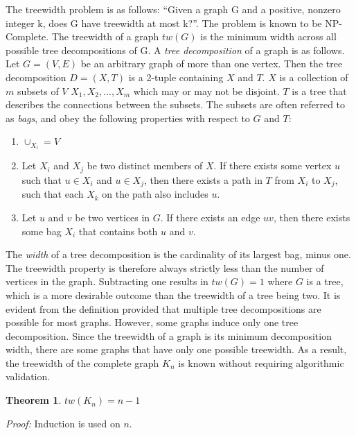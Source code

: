 \documentclass[12pt,conference]{IEEEtran}
\theoremstyle{plain}
\newtheorem{theorem}{Theorem}
\begin{document}
The treewidth problem is as follows: ``Given a graph G and a positive, nonzero integer k, does G have treewidth at most k?''. The problem is known to be NP-Complete. The treewidth of a graph $tw(G)$ is the minimum width across all possible tree decompositions of G. A \textit{tree decomposition} of a graph is as follows. Let $G=(V,E)$ be an arbitrary graph of more than one vertex. Then the tree decomposition $D = (X,T)$ is a 2-tuple containing $X$ and $T$. $X$ is a collection of $m$ subsets of $V$ $X_{1}, X_{2}, ..., X_{m}$ which may or may not be disjoint. $T$ is a tree that describes the connections between the subsets. The subsets are often referred to as \textit{bags}, and obey the following properties with respect to $G$ and $T$:

\begin{enumerate}
\item $\cup_{X_{i}} = V$
\item Let $X_{i}$ and $X_{j}$ be two distinct members of $X$. If there exists some vertex $u$ such that $u \in X_{i}$ and $u \in X_{j}$, then there exists a path in $T$ from $X_{i}$ to $X_{j}$, such that each $X_{k}$ on the path also includes $u$.
\item Let $u$ and $v$ be two vertices in $G$. If there exists an edge $uv$, then there exists some bag $X_{i}$ that contains both $u$ and $v$.
\end{enumerate}

The \textit{width} of a tree decomposition is the cardinality of its largest bag, minus one. The treewidth property is therefore always strictly less than the number of vertices in the graph. Subtracting one results in $tw(G)=1$ where $G$ is a tree, which is a more desirable outcome than the treewidth of a tree being two. It is evident from the definition provided that multiple tree decompositions are possible for most graphs. However, some graphs induce only one tree decomposition. Since the treewidth of a graph is its minimum decomposition width, there are some graphs that have only one possible treewidth. As a result, the treewidth of the complete graph $K_{n}$ is known without requiring algorithmic validation.

\begin{theorem}
  $tw(K_{n}) = n-1$
\end{theorem}

\textit{Proof:} Induction is used on $n$. 
\end{document}
